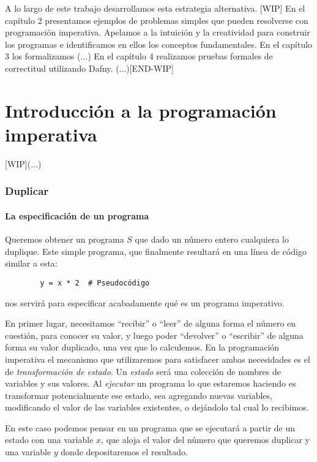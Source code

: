 \documentclass[12pt, a4paper, openany, fleqn]{book}
\begin{document}
    A lo largo de este trabajo desarrollamos esta estrategia alternativa.
    [WIP]
    En el capítulo 2 presentamos ejemplos de problemas simples que pueden resolverse con programación imperativa. Apelamos a la intuición y la creatividad para construir los programas e identificamos en ellos los conceptos fundamentales.
    En el capítulo 3 los formalizamos (...)
    En el capítulo 4 realizamos pruebas formales de correctitud utilizando Dafny. (...)[END-WIP]

    \chapter{Introducción a la programación imperativa}
    [WIP](...)

    \subsection{Duplicar}
    \subsubsection*{La especificación de un programa}

    Queremos obtener un programa $S$ que dado un número entero cualquiera lo duplique. Este simple programa, que finalmente resultará en una línea de código similar a esta:
    \begin{verbatim}
        y = x * 2  # Pseudocódigo
    \end{verbatim}
    nos servirá para especificar acabadamente qué es un programa imperativo.


    En primer lugar, necesitamos ``recibir'' o ``leer'' de alguna forma el número en cuestión, para conocer su valor, y luego poder ``devolver'' o ``escribir'' de alguna forma su valor duplicado, una vez que lo calculemos.
    En la programación imperativa el mecanismo que utilizaremos para satisfacer ambas necesidades es el de \textit{transformación de estado}.
    Un \textit{estado} será una colección de nombres de variables y sus valores. Al \textit{ejecutar} un programa lo que estaremos haciendo es transformar potencialmente ese estado, sea agregando nuevas variables, modificando el valor de las variables existentes, o dejándolo tal cual lo recibimos.

    En este caso podemos pensar en un programa que se ejecutará a partir de un estado con una variable $x$, que aloja el valor del número que queremos duplicar y una variable $y$ donde depositaremos el resultado.
\end{document}
